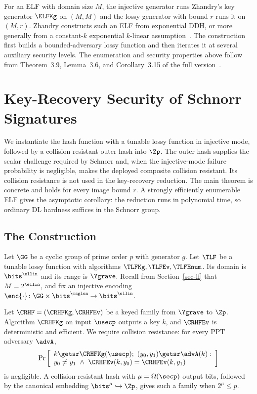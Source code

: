 For an ELF with domain size $M$, the injective generator runs Zhandry's key generator $\ELFKg$ on $(M,M)$ and the lossy generator with bound $r$ runs it on $(M,r)$. Zhandry constructs such an ELF from exponential DDH, or more generally from a constant-$k$ exponential $k$-linear assumption~\cite{C:Zhandry16}. The construction first builds a bounded-adversary lossy function and then iterates it at several auxiliary security levels. The enumeration and security properties above follow from Theorem~3.9, Lemma~3.6, and Corollary~3.15 of the full version~\cite{EPRINT:Zhandry16}.

\section{Key-Recovery Security of Schnorr Signatures} \label{sec-lf-kr}

We instantiate the hash function with a tunable lossy function in injective mode, followed by a collision-resistant outer hash into $\Zp$. The outer hash supplies the scalar challenge required by Schnorr and, when the injective-mode failure probability is negligible, makes the deployed composite collision resistant. Its collision resistance is not used in the key-recovery reduction. The main theorem is concrete and holds for every image bound $r$. A strongly efficiently enumerable ELF gives the asymptotic corollary: the reduction runs in polynomial time, so ordinary DL hardness suffices in the Schnorr group.

\subsection{The Construction} \label{sec-lf-constr}

Let $\GG$ be a cyclic group of prime order $p$ with generator $g$. Let $\TLF$ be a tunable lossy function with algorithms $\TLFKg,\TLFEv,\TLFEnum$. Its domain is $\bits^{\ellin}$ and its range is $\Ygrave$. Recall from Section~\ref{sec-lf} that $M=2^{\ellin}$, and fix an injective encoding $\enc{\cdot}\colon\GG\times\bits^{\msglen}\to\bits^{\ellin}$.

Let $\CRHF=(\CRHFKg,\CRHFEv)$ be a keyed family from $\Ygrave$ to $\Zp$. Algorithm $\CRHFKg$ on input $\usecp$ outputs a key $k$, and $\CRHFEv$ is deterministic and efficient. We require collision resistance: for every PPT adversary $\advA$,
$$
\Pr\left[
\begin{array}{l}
k\getsr\CRHFKg(\usecp);\ (y_0,y_1)\getsr\advA(k):\\
y_0\ne y_1\ \land\ \CRHFEv(k,y_0)=\CRHFEv(k,y_1)
\end{array}
\right]
$$
is negligible. A collision-resistant hash with $\mu=\Omega(\secp)$ output bits, followed by the canonical embedding $\bits^\mu\hookrightarrow\Zp$, gives such a family when $2^\mu\le p$.

